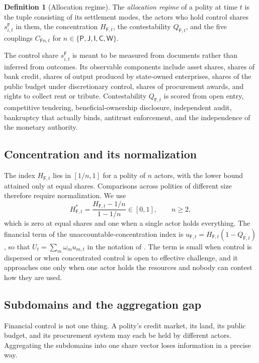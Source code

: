 \documentclass[11pt,letterpaper]{article}
\theoremstyle{definition}
\newtheorem{definition}[theorem]{Definition}
\theoremstyle{remark}
\newcommand{\pF}{\mathsf{F}}
\newcommand{\pP}{\mathsf{P}}
\newcommand{\pJ}{\mathsf{J}}
\newcommand{\pI}{\mathsf{I}}
\newcommand{\pC}{\mathsf{C}}
\newcommand{\pW}{\mathsf{W}}
\begin{document}
\begin{definition}[Allocation regime]
\label{def:financial-power:allocation-regime}
The \emph{allocation regime} of a polity at time $t$ is the tuple consisting of its settlement modes, the actors who hold control shares $s^{\pF}_{i,t}$ in them, the concentration $H_{\pF,t}$, the contestability $Q_{\pF,t}$, and the five couplings $C_{\pF n,t}$ for $n\in\{\pP,\pJ,\pI,\pC,\pW\}$.
\end{definition}

The control share $s^{\pF}_{i,t}$ is meant to be measured from documents rather than inferred from outcomes. Its observable components include asset shares, shares of bank credit, shares of output produced by state-owned enterprises, shares of the public budget under discretionary control, shares of procurement awards, and rights to collect rent or tribute. Contestability $Q_{\pF,t}$ is scored from open entry, competitive tendering, beneficial-ownership disclosure, independent audit, bankruptcy that actually binds, antitrust enforcement, and the independence of the monetary authority.

\subsection{Concentration and its normalization}

The index $H_{\pF,t}$ lies in $[1/n,1]$ for a polity of $n$ actors, with the lower bound attained only at equal shares. Comparisons across polities of different size therefore require normalization. We use
\begin{equation}
\label{eq:hstar}
H^{*}_{\pF,t}=\frac{H_{\pF,t}-1/n}{1-1/n}\in[0,1],\qquad n\geq 2,
\end{equation}
which is zero at equal shares and one when a single actor holds everything. The financial term of the unaccountable-concentration index is $u_{\pF,t}=H_{\pF,t}(1-Q_{\pF,t})$, so that $U_t=\sum_m\omega_m u_{m,t}$ in the notation of \citet{largo2026hbs}. The term is small when control is dispersed or when concentrated control is open to effective challenge, and it approaches one only when one actor holds the resources and nobody can contest how they are used.

\subsection{Subdomains and the aggregation gap}

Financial control is not one thing. A polity's credit market, its land, its public budget, and its procurement system may each be held by different actors. Aggregating the subdomains into one share vector loses information in a precise way.
\end{document}
